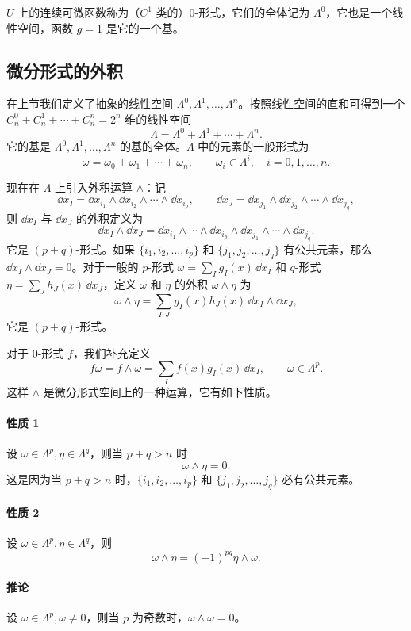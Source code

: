 $U$ 上的连续可微函数称为（$C^1$ 类的）0-形式，它们的全体记为 $\Lambda^0$，它也是一个线性空间，函数 $g=1$ 是它的一个基。

\subsection{微分形式的外积}

在上节我们定义了抽象的线性空间 $\Lambda^0,\Lambda^1,\ldots,\Lambda^n$。按照线性空间的直和可得到一个 $C_n^0+C_n^1+\cdots+C_n^n=2^n$ 维的线性空间
\[
  \Lambda=\Lambda^0+\Lambda^1+\cdots+\Lambda^n.
\]
它的基是 $\Lambda^0,\Lambda^1,\ldots,\Lambda^n$ 的基的全体。$\Lambda$ 中的元素的一般形式为
\[
  \omega=\omega_0+\omega_1+\cdots+\omega_n,
  \qquad \omega_i\in\Lambda^i,\quad i=0,1,\ldots,n.
\]

现在在 $\Lambda$ 上引入外积运算 $\wedge$：记
\[
  \dd x_I=\dd x_{i_1}\wedge\dd x_{i_2}\wedge\cdots\wedge\dd x_{i_p},\qquad
  \dd x_J=\dd x_{j_1}\wedge\dd x_{j_2}\wedge\cdots\wedge\dd x_{j_q},
\]
则 $\dd x_I$ 与 $\dd x_J$ 的外积定义为
\[
  \dd x_I\wedge\dd x_J
  =\dd x_{i_1}\wedge\cdots\wedge\dd x_{i_p}\wedge
  \dd x_{j_1}\wedge\cdots\wedge\dd x_{j_q}.
\]
它是 $(p+q)$-形式。如果 $\{i_1,i_2,\ldots,i_p\}$ 和 $\{j_1,j_2,\ldots,j_q\}$ 有公共元素，那么 $\dd x_I\wedge\dd x_J=0$。对于一般的 $p$-形式 $\omega=\sum_Ig_I(x)\,\dd x_I$ 和 $q$-形式 $\eta=\sum_Jh_J(x)\,\dd x_J$，定义 $\omega$ 和 $\eta$ 的外积 $\omega\wedge\eta$ 为
\[
  \omega\wedge\eta=\sum_{I,J}g_I(x)h_J(x)\,\dd x_I\wedge\dd x_J,
\]
它是 $(p+q)$-形式。

对于 0-形式 $f$，我们补充定义
\[
  f\omega=f\wedge\omega=\sum_I f(x)g_I(x)\,\dd x_I,\qquad\omega\in\Lambda^p.
\]
这样 $\wedge$ 是微分形式空间上的一种运算，它有如下性质。

\paragraph{性质 1}
设 $\omega\in\Lambda^p,\eta\in\Lambda^q$，则当 $p+q>n$ 时
\[
  \omega\wedge\eta=0.
\]
这是因为当 $p+q>n$ 时，$\{i_1,i_2,\ldots,i_p\}$ 和 $\{j_1,j_2,\ldots,j_q\}$ 必有公共元素。

\paragraph{性质 2}
设 $\omega\in\Lambda^p,\eta\in\Lambda^q$，则
\[
  \omega\wedge\eta=(-1)^{pq}\eta\wedge\omega.
\]

\paragraph{推论}
设 $\omega\in\Lambda^p,\omega\ne0$，则当 $p$ 为奇数时，$\omega\wedge\omega=0$。

